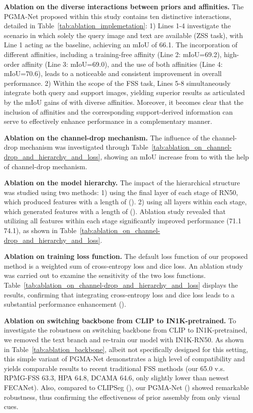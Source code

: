\documentclass[lettersize,journal]{IEEEtran}
\begin{document}
\textbf{Ablation on the diverse interactions between priors and affinities.} 
The PGMA-Net proposed within this study contains ten distinctive interactions, detailed in Table~\ref{tab:ablation_implemetation}: 1) Lines 1-4 investigate the scenario in which solely the query image and text are available (ZSS task), with Line 1 acting as the baseline, achieving an mIoU of 66.1. The incorporation of different affinities, including a training-free affinity (Line 2: mIoU=69.2), high-order affinity (Line 3: mIoU=69.0), and the use of both affinities (Line 4: mIoU=70.6), leads to a noticeable and consistent improvement in overall performance. 2) Within the scope of the FSS task, Lines 5-8 simultaneously integrate both query and support images, yielding superior results as articulated by the mIoU gains of  with diverse affinities. Moreover, it becomes clear that the inclusion of affinities and the corresponding support-derived information can serve to effectively enhance performance in a complementary manner.

\textbf{Ablation on the channel-drop mechanism.} The influence of the channel-drop mechanism was investigated through Table~\ref{tab:ablation_on_channel-drop_and_hierarchy_and_loss}, showing an mIoU increase from  to  with the help of channel-drop mechanism.


\textbf{Ablation on the model hierarchy.} The impact of the hierarchical structure was studied using two methods: 1) using the final layer of each stage of RN50, which produced features with a length of (). 2) using all layers within each stage, which generated features with a length of (). Ablation study revealed that utilizing all features within each stage significantly improved performance (71.1  74.1), as shown in Table~\ref{tab:ablation_on_channel-drop_and_hierarchy_and_loss}.


\textbf{Ablation on training loss function.} 
The default loss function of our proposed method is a weighted sum of cross-entropy loss and dice loss. An ablation study was carried out to examine the sensitivity of the two loss functions. Table~\ref{tab:ablation_on_channel-drop_and_hierarchy_and_loss} displays the results, confirming that integrating cross-entropy loss and dice loss leads to a substantial performance enhancement ().


\textbf{Ablation on switching backbone from CLIP to IN1K-pretrained.} To investigate the robustness on switching backbone from CLIP to IN1K-pretrained, we removed the text branch and re-train our model with IN1K-RN50. As shown in Table~\ref{tab:ablation_backbone}, albeit not specifically designed for this setting, this simple variant of PGMA-Net demonstrates a high level of compatibility and yields comparable results to recent traditional FSS methods (our 65.0 v.s. RPMG-FSS 63.3, HPA 64.8, DCAMA 64.6, only slightly lower than newest FECANet). Also, compared to CLIPSeg (), our PGMA-Net () showed remarkable robustness, thus confirming the effectiveness of prior assembly from only visual cues.
\end{document}
